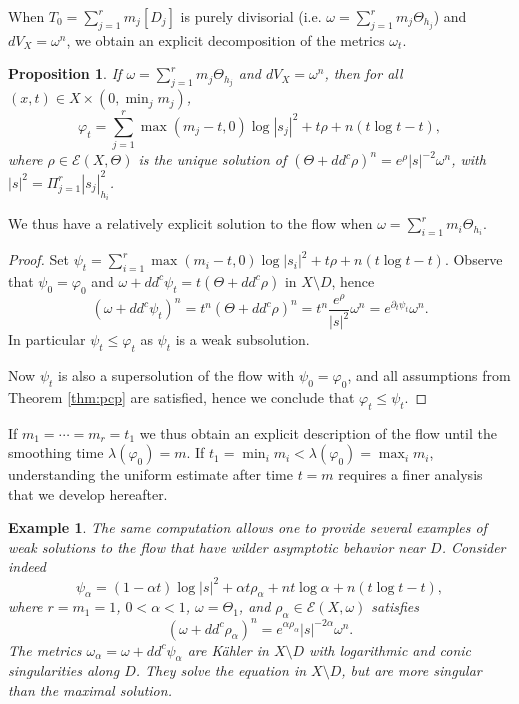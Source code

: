 \documentclass[11pt]{amsart}
\numberwithin{equation}{section}
\newtheorem{prop}[theorem]{Proposition}
\newtheorem{exa}[theorem]{Example}
\newcommand{\f}{\varphi}
\newcommand{\p}{\psi}
\newcommand \la {\lambda}
\begin{document}
When $T_0=\sum_{j=1}^r m_j[D_j]$ is purely divisorial
(i.e. $\omega=\sum_{j=1}^r m_j \Theta_{h_j}$) and $dV_X=\omega^n$,
we obtain an explicit decomposition of the metrics $\omega_t$.


\begin{prop} \label{pro:decompo}
If   $\omega=\sum_{j=1}^r m_j \Theta_{h_j}$ and $dV_X=\omega^n$, then for all $(x,t) \in X \times (0,\min_j m_j)$,
$$
\f_t=\sum_{j=1}^r \max(m_j-t,0) \log|s_j|^2 +t \rho +n(t\log t-t), 
$$
where $\rho \in {\mathcal E}(X,\Theta)$ is the unique solution of $(\Theta+dd^c \rho)^n =e^{\rho} |s|^{-2} \omega^n$,
with $|s|^2=\Pi_{j=1}^r |s_j|^{2}_{h_i}$.
\end{prop}

We thus have a relatively explicit solution to the flow when  $\omega=\sum_{i=1}^r m_i \Theta_{h_i}$. 

\begin{proof}
Set $\p_t=\sum_{i=1}^r \max(m_i-t,0) \log|s_i|^2+t \rho+n(t\log t-t)$. Observe that 
$\p_0=\f_0$ and $\omega+dd^c \p_t=t (\Theta+dd^c \rho)$ in $X \setminus D$,
hence
$$
(\omega+dd^c \p_t)^n=t^n (\Theta+dd^c \rho)^n=t^n \frac{e^{\rho}}{|s|^2} \omega^n=e^{\partial_t \p_t} \omega^n.
$$
In particular $\p_t \leq \f_t$ as $\p_t$ is a weak subsolution.

Now $\p_t$ is also a supersolution of the flow with $\p_0=\f_0$,
and all assumptions from Theorem \ref{thm:pcp} are satisfied, hence we conclude that $\f_t \leq \p_t$.
\end{proof}

If $m_1=\cdots=m_r=t_1$ we thus obtain an explicit description of the flow until the smoothing
time $\la(\f_0)=m$. If $t_1=\min_i m_i < \la(\f_0)=\max_i m_i$, understanding
the uniform estimate after time $t=m$ requires a finer analysis that we develop hereafter.



\begin{exa} \label{exa:notunique}
The same computation allows one to provide several examples of weak solutions to the
flow that have wilder asymptotic behavior near $D$. Consider indeed
$$
\p_{\alpha}=(1-\alpha t) \log |s|^2+ \alpha t \rho_{\alpha}+nt \log \alpha+n (t \log t-t),
$$
where $r=m_1=1$,
$0<\alpha<1$, $\omega= \Theta_{1}$,
and $\rho_{\alpha} \in {\mathcal E}(X,\omega)$ satisfies
$$
(\omega+dd^c \rho_{\alpha})^n=e^{\alpha \rho_{\alpha}} |s|^{-2\alpha} \omega^n.
$$
The metrics $\omega_{\alpha}=\omega+dd^c \p_{\alpha}$ are K\"ahler   in $X \setminus D$ with 
 logarithmic and conic singularities along $D$. They solve the  equation in 
$X \setminus D$, but   are   more singular than the maximal solution.
\end{exa}
\end{document}
